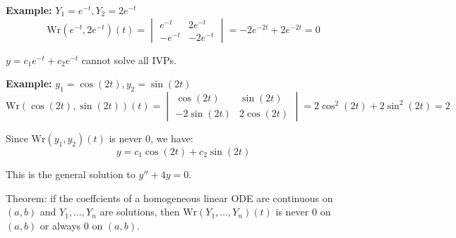 \documentclass{article}
\begin{document}
\textbf{Example:} \( Y_1 = e^{-t}, Y_2 = 2e^{-t} \)
\[
\text{Wr}(e^{-t}, 2e^{-t})(t) = \begin{vmatrix}
e^{-t} & 2e^{-t} \\
-e^{-t} & -2e^{-t}
\end{vmatrix}
= -2e^{-2t} + 2e^{-2t} = 0
\]

\( y = c_1 e^{-t} + c_2 e^{-t} \) cannot solve all IVPs.

\textbf{Example:} \( y_1 = \cos(2t), y_2 = \sin(2t) \)
\[
\text{Wr}(\cos(2t), \sin(2t))(t) = \begin{vmatrix}
\cos(2t) & \sin(2t) \\
-2\sin(2t) & 2\cos(2t)
\end{vmatrix}
= 2\cos^2(2t) + 2\sin^2(2t) = 2
\]

Since \( \text{Wr}(y_1, y_2)(t) \) is never 0, we have:
\[
y = c_1 \cos(2t) + c_2 \sin(2t)
\]

This is the general solution to \( y'' + 4y = 0 \).


Theorem: if the coeffcients of a homogeneous linear ODE are continuous on \((a, b)\) and \(Y_1, \ldots, Y_n\) are solutions, then \(\text{Wr}(Y_1, \ldots, Y_n)(t)\) is never 0 on \((a, b)\) or always 0 on \((a, b)\).
\end{document}
